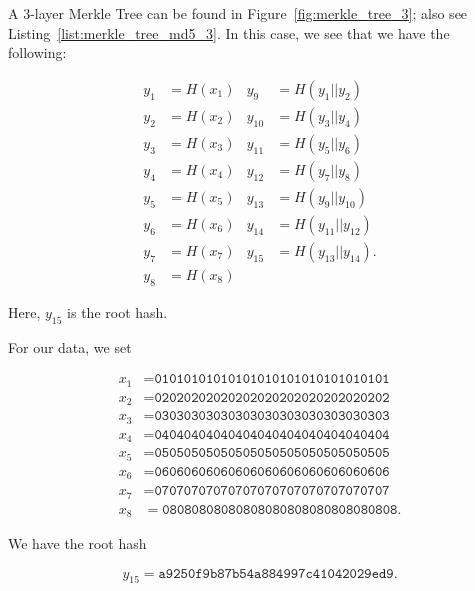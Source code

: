 \begin{example}

A 3-layer Merkle Tree can be found in Figure~\ref{fig:merkle_tree_3};
also see Listing~\ref{list:merkle_tree_md5_3}.
In this case, we see that we have the following:




\begin{align}
    y_{1}  &= H(x_{1})
        &
    y_{9}  &= H(y_{1}||y_{2}) \nonumber\\
    y_{2}  &= H(x_{2})
        &
    y_{10} &= H(y_{3}||y_{4}) \nonumber\\
    y_{3}  &= H(x_{3})
        &
    y_{11} &= H(y_{5}||y_{6}) \nonumber\\
    y_{4}  &= H(x_{4})
        &
    y_{12} &= H(y_{7}||y_{8}) \nonumber\\
    y_{5}  &= H(x_{5})
        &
    y_{13} &= H(y_{9}||y_{10}) \nonumber\\
    y_{6}  &= H(x_{6})
        &
    y_{14} &= H(y_{11}||y_{12}) \nonumber\\
    y_{7}  &= H(x_{7})
        &
    y_{15} &= H(y_{13}||y_{14}). \nonumber\\
    y_{8}  &= H(x_{8})
    \label{eq:merkle_tree_3_def}
\end{align}

\noindent
Here, $y_{15}$ is the root hash.

For our data, we set

\begin{align}
    x_{1} &= \texttt{01010101010101010101010101010101}
        \nonumber\\
    x_{2} &= \texttt{02020202020202020202020202020202}
        \nonumber\\
    x_{3} &= \texttt{03030303030303030303030303030303}
        \nonumber\\
    x_{4} &= \texttt{04040404040404040404040404040404}
        \nonumber\\
    x_{5} &= \texttt{05050505050505050505050505050505}
        \nonumber\\
    x_{6} &= \texttt{06060606060606060606060606060606}
        \nonumber\\
    x_{7} &= \texttt{07070707070707070707070707070707}
        \nonumber\\
    x_{8} &= \texttt{08080808080808080808080808080808}.
\end{align}

\noindent
We have the root hash

\begin{equation}
    y_{15} = \texttt{a9250f9b87b54a884997c41042029ed9}.
    \label{eq:merkle_tree_3_root_hash}
\end{equation}
\end{example}


